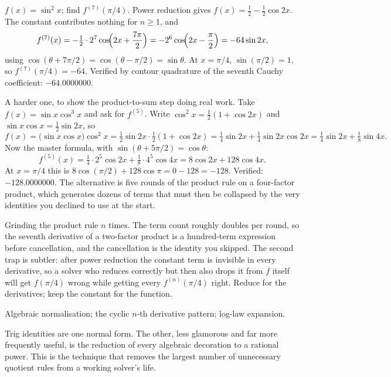\begin{worked}
$f(x)=\sin^{2}x$; find $f^{(7)}(\pi/4)$. Power reduction gives $f(x)=\tfrac12-\tfrac12\cos 2x$. The constant contributes nothing for $n\geq1$, and
\[
f^{(7)}(x)=-\tfrac12\cdot 2^{7}\cos\!\Bigl(2x+\frac{7\pi}{2}\Bigr)=-2^{6}\cos\!\Bigl(2x-\frac{\pi}{2}\Bigr)=-64\sin 2x,
\]
using $\cos(\theta+7\pi/2)=\cos(\theta-\pi/2)=\sin\theta$. At $x=\pi/4$, $\sin(\pi/2)=1$, so $f^{(7)}(\pi/4)=-64$. Verified by contour quadrature of the seventh Cauchy coefficient: $-64.0000000$.

A harder one, to show the product-to-sum step doing real work. Take $f(x)=\sin x\cos^{3}x$ and ask for $f^{(5)}$. Write $\cos^{2}x=\tfrac12(1+\cos 2x)$ and $\sin x\cos x=\tfrac12\sin 2x$, so
\[
f(x)=\bigl(\sin x\cos x\bigr)\cos^{2}x=\tfrac12\sin 2x\cdot\tfrac12(1+\cos 2x)=\tfrac14\sin 2x+\tfrac14\sin 2x\cos 2x=\tfrac14\sin 2x+\tfrac18\sin 4x .
\]
Now the master formula, with $\sin(\theta+5\pi/2)=\cos\theta$:
\[
f^{(5)}(x)=\tfrac14\cdot2^{5}\cos 2x+\tfrac18\cdot4^{5}\cos 4x=8\cos 2x+128\cos 4x .
\]
At $x=\pi/4$ this is $8\cos(\pi/2)+128\cos\pi=0-128=-128$. Verified: $-128.0000000$. The alternative is five rounds of the product rule on a four-factor product, which generates dozens of terms that must then be collapsed by the very identities you declined to use at the start.
\end{worked}

\begin{trap}
Grinding the product rule $n$ times. The term count roughly doubles per round, so the seventh derivative of a two-factor product is a hundred-term expression before cancellation, and the cancellation is the identity you skipped. The second trap is subtler: after power reduction the constant term is invisible in every derivative, so a solver who reduces correctly but then also drops it from $f$ itself will get $f(\pi/4)$ wrong while getting every $f^{(n)}(\pi/4)$ right. Reduce for the derivatives; keep the constant for the function.
\end{trap}

\begin{seealsob}Algebraic normalisation; the cyclic $n$-th derivative pattern; log-law expansion.\end{seealsob}

Trig identities are one normal form. The other, less glamorous and far more frequently useful, is the reduction of every algebraic decoration to a rational power. This is the technique that removes the largest number of unnecessary quotient rules from a working solver's life.

